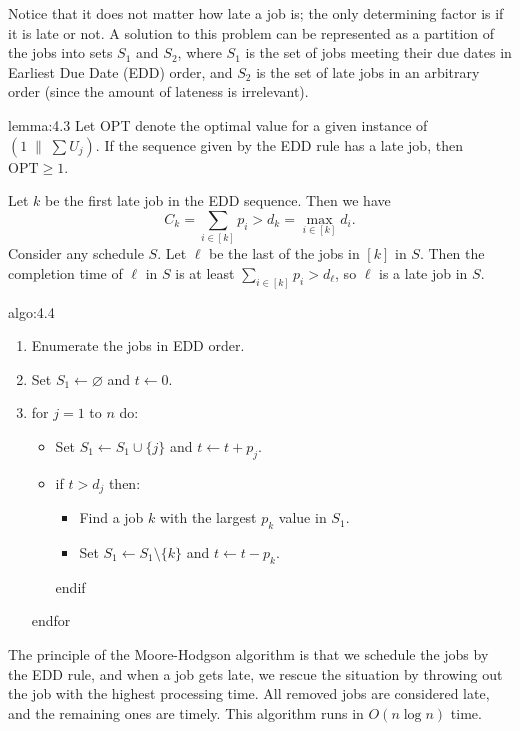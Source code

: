 Notice that it does not matter how late a job is; the only 
determining factor is if it is late or not. A solution to this problem can 
be represented as a partition of the jobs into sets $S_1$ and $S_2$, where 
$S_1$ is the set of jobs meeting their due dates in Earliest Due Date (EDD)
order, and $S_2$ is the set of late jobs in an arbitrary order (since the 
amount of lateness is irrelevant).  

\begin{lemma}{lemma:4.3}
    Let OPT denote the optimal value for a given instance of $(1\;\|\;\sum U_j)$.
    If the sequence given by the EDD rule has a late job, then $\text{OPT} \geq 1$. 
\end{lemma}
\begin{pf}
    Let $k$ be the first late job in the EDD sequence. Then we have 
    \[ C_k = \sum_{i\in[k]} p_i > d_k = \max_{i\in[k]} d_i. \] 
    Consider any schedule $S$. Let $\ell$ be the last of the jobs in $[k]$ in 
    $S$. Then the completion time of $\ell$ in $S$ is at least $\sum_{i\in[k]} 
    p_i > d_\ell$, so $\ell$ is a late job in $S$. 
\end{pf}

\begin{algo}{algo:4.4}
    \begin{enumerate}
        \item Enumerate the jobs in EDD order. 
        \item Set $S_1 \gets \varnothing$ and $t \gets 0$. 
        \item for $j=1$ to $n$ do: 
        \begin{itemize}[\label{}]
            \item Set $S_1 \gets S_1 \cup \{j\}$ and $t \gets t + p_j$. 
            \item if $t > d_j$ then: 
            \begin{itemize}[\label{}]
                \item Find a job $k$ with the largest $p_k$ value in $S_1$. 
                \item Set $S_1 \gets S_1 \setminus \{k\}$ and $t \gets t - p_k$. 
            \end{itemize}
            endif
        \end{itemize}
        endfor
    \end{enumerate}
\end{algo}

The principle of the Moore-Hodgson algorithm is that we schedule the jobs by the EDD 
rule, and when a job gets late, we rescue the situation by throwing out the job with 
the highest processing time. All removed jobs are considered late, and the remaining 
ones are timely. This algorithm runs in $O(n\log n)$ time. 

